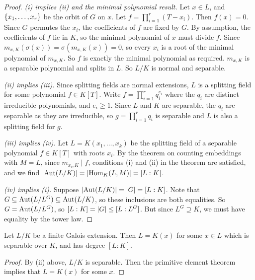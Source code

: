 \begin{proof}
	\emph{(i) implies (ii) and the minimal polynomial result.}
	Let \( x \in L \), and \( \qty{x_1, \dots, x_r} \) be the orbit of \( G \) on \( x \).
	Let \( f = \prod_{i=1}^r (T - x_i) \).
	Then \( f(x) = 0 \).
	Since \( G \) permutes the \( x_i \), the coefficients of \( f \) are fixed by \( G \).
	By assumption, the coefficients of \( f \) lie in \( K \), so the minimal polynomial of \( x \) must divide \( f \).
	Since \( m_{x,K}(\sigma(x)) = \sigma(m_{x,K}(x)) = 0 \), so every \( x_i \) is a root of the minimal polynomial of \( m_{x,K} \).
	So \( f \) is exactly the minimal polynomial as required.
	\( m_{x,K} \) is a separable polynomial and splits in \( L \).
	So \( L / K \) is normal and separable.

	\emph{(ii) implies (iii).}
	Since splitting fields are normal extensions, \( L \) is a splitting field for some polynomial \( f \in K[T] \).
	Write \( f = \prod_{i=1}^r q_i^{e_i} \) where the \( q_i \) are distinct irreducible polynomials, and \( e_i \geq 1 \).
	Since \( L \) and \( K \) are separable, the \( q_i \) are separable as they are irreducible, so \( g = \prod_{i=1}^r q_i \) is separable and \( L \) is also a splitting field for \( g \).

	\emph{(iii) implies (iv).}
	Let \( L = K(x_1, \dots, x_k) \) be the splitting field of a separable polynomial \( f \in K[T] \) with roots \( x_i \).
	By the theorem on counting embeddings with \( M = L \), since \( m_{x_i,K} \mid f \), conditions (i) and (ii) in the theorem are satisfied, and we find \( \abs{\operatorname{Aut}(L/K)} = \abs{\operatorname{Hom}_K(L,M)} = [L:K] \).

	\emph{(iv) implies (i).}
	Suppose \( \abs{\operatorname{Aut}(L/K)} = \abs{G} = [L : K] \).
	Note that \( G \subseteq \operatorname{Aut}(L/L^G) \subseteq \operatorname{Aut}(L/K) \), so these inclusions are both equalities.
	So \( G = \operatorname{Aut}(L/L^G) \), so \( [L : K] = \abs{G} \leq [L : L^G] \).
	But since \( L^G \supseteq K \), we must have equality by the tower law.
\end{proof}
\begin{corollary}
	Let \( L / K \) be a finite Galois extension.
	Then \( L = K(x) \) for some \( x \in L \) which is separable over \( K \), and has degree \( [L : K] \).
\end{corollary}
\begin{proof}
	By (ii) above, \( L / K \) is separable.
	Then the primitive element theorem implies that \( L = K(x) \) for some \( x \).
\end{proof}

